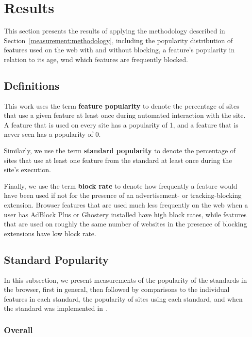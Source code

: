 \section{Results}
\label{measuement:results}

This section presents the results of applying the methodology described
in Section~\ref{measurement:methodology}, including the popularity distribution
of \JS features used on the web with and without blocking, a feature's popularity
in relation to its age, wnd which features are frequently blocked.

\subsection{Definitions}
This work uses the term \textbf{feature popularity} to denote the percentage of
sites that use a given feature at least once during automated interaction with
the site.  A feature that is used on every site has a popularity of 1, and
a feature that is never seen has a popularity of 0.

Similarly, we use the term \textbf{standard popularity} to denote the
percentage of sites that use at least one feature from the standard at least
once during the site's execution.

Finally, we use the term \textbf{block rate} to denote how
frequently a feature would have been used if not for the presence of an
advertisement- or tracking-blocking extension. Browser features
that are used much less frequently on the web when a user has AdBlock Plus or
Ghostery installed have high block rates, while features that are used on
roughly the same number of websites in the presence of blocking extensions have
low block rate.

\subsection{Standard Popularity}
In this subsection, we present measurements of the popularity of the standards
in the browser, first in general, then followed by comparisons to the individual
features in each standard, the popularity of sites using each standard,
and when the standard was implemented in \FF.


\subsubsection{Overall}



